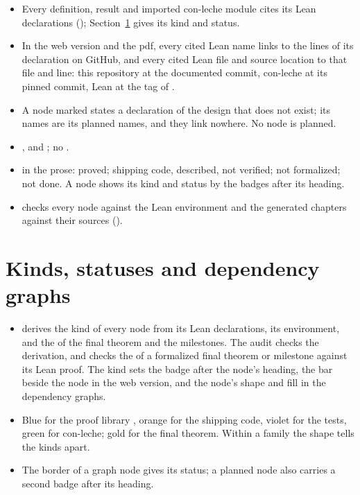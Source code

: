\begin{itemize}
\item {} Every definition, result and imported con-leche module cites its Lean
  declarations (); Section~\ref{sec:intro-kinds} gives its kind and
  status.
\item {} In the web version and the pdf, every cited Lean name links to the
  lines of its declaration on GitHub, and every cited Lean file and source location to that file
  and line: this repository at the documented commit, con-leche at its pinned commit, Lean at the
  tag of .
\item {} A node marked \stPlanned{} states a declaration of the design that does
  not exist; its  names are its planned names, and they link
  nowhere. No node is planned.
\item {} ,  and ; no
  .
\item {} in the prose: \stProved{} proved; \stShipping{} shipping code,
  described, not verified; \stPlanned{} not formalized; \stOpen{} not done. A node shows its kind
  and status by the badges after its heading.
\item {}  checks every node against the Lean
  environment and the generated chapters against their sources ().
\end{itemize}

\section{Kinds, statuses and dependency graphs}\label{sec:intro-kinds}

\begin{itemize}
\item {}  derives the kind of every node from its Lean
  declarations, its environment, and the  of the final theorem and the
  milestones. The audit checks the derivation, and checks the  of a
  formalized final theorem or milestone against its Lean proof. The kind sets the badge after the
  node's heading, the bar beside the node in the web version, and the node's shape and fill in the
  dependency graphs.
\item {} Blue for the proof library , orange for the shipping
  code, violet for the tests, green for con-leche; gold for the final theorem. Within a family the
  shape tells the kinds apart.
\item {} The border of a graph node gives its status; a planned node also carries a
  second badge after its heading.
\end{itemize}

